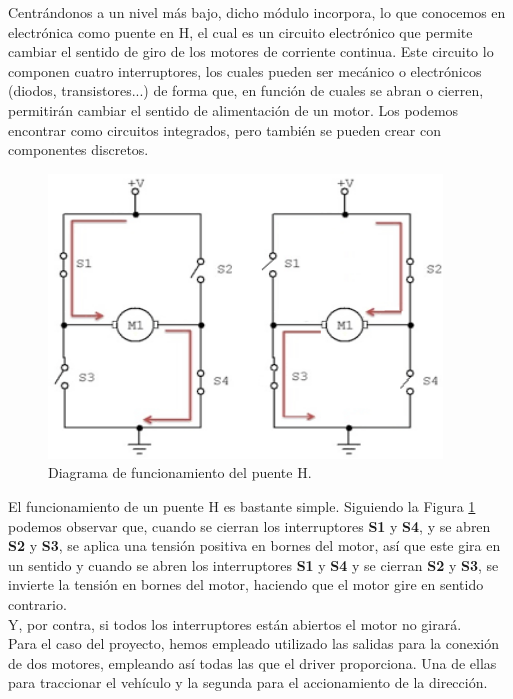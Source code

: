 Centrándonos a un nivel más bajo, dicho módulo incorpora, lo que conocemos en electrónica como puente en H, el cual es un circuito electrónico que permite cambiar el sentido de giro de los 
motores de corriente continua. Este circuito lo componen cuatro interruptores, los cuales pueden ser mecánico o electrónicos (diodos, transistores...) de forma que,
en función de cuales se abran o cierren, permitirán cambiar el sentido de alimentación de un motor.  Los podemos encontrar como circuitos integrados, pero también se
pueden crear con componentes discretos.\\

\begin{figure}[H]
  \begin{center}
    \includegraphics[scale=0.7]{imagenes/esquema_puente_h.png}
  \end{center}
  \caption{Diagrama de funcionamiento del puente H.}
  \label{esquema:funcionamiento_puente_h}
\end{figure}

El funcionamiento de un puente H es bastante simple. Siguiendo la Figura \ref{esquema:funcionamiento_puente_h} podemos observar que, cuando se cierran los interruptores \textbf{S1} y \textbf{S4}, y se abren \textbf{S2} y \textbf{S3}, se aplica una tensión positiva en bornes del motor, así 
que este gira en un sentido y cuando se abren los interruptores \textbf{S1} y \textbf{S4} y se cierran \textbf{S2} y \textbf{S3}, se invierte la tensión en bornes del motor, haciendo que el motor gire en sentido contrario.\\

Y, por contra, si todos los interruptores están abiertos el motor no girará. \\

Para el caso del proyecto, hemos empleado utilizado las salidas para la conexión de dos motores, empleando así todas las que el driver proporciona. Una de ellas para traccionar
el vehículo y la segunda para el accionamiento de la dirección.\\

